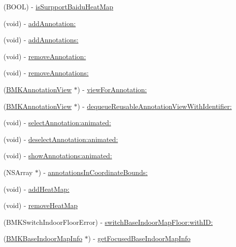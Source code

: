 \begin{DoxyCompactItemize}
\item 
(B\+O\+O\+L) -\/ \hyperlink{interface_b_m_k_map_view_a2256a65857b14f9cd56655663a966e14}{is\+Surpport\+Baidu\+Heat\+Map}
\item 
(void) -\/ \hyperlink{interface_b_m_k_map_view_a2af9ed45c3a7fd530dd414dc573327b3}{add\+Annotation\+:}
\item 
(void) -\/ \hyperlink{interface_b_m_k_map_view_affd032313c55ae27814430b760e4aea0}{add\+Annotations\+:}
\item 
(void) -\/ \hyperlink{interface_b_m_k_map_view_a6b6b75a5bf8b02854767f782a38d2009}{remove\+Annotation\+:}
\item 
(void) -\/ \hyperlink{interface_b_m_k_map_view_a37fbe2b5db750affb4e0234cbf24a3c7}{remove\+Annotations\+:}
\item 
(\hyperlink{interface_b_m_k_annotation_view}{B\+M\+K\+Annotation\+View} $\ast$) -\/ \hyperlink{interface_b_m_k_map_view_a0fb885234188aef28df944d5f636c70c}{view\+For\+Annotation\+:}
\item 
(\hyperlink{interface_b_m_k_annotation_view}{B\+M\+K\+Annotation\+View} $\ast$) -\/ \hyperlink{interface_b_m_k_map_view_a4d4aa7a171876f3f66add8f86cca1e8c}{dequeue\+Reusable\+Annotation\+View\+With\+Identifier\+:}
\item 
(void) -\/ \hyperlink{interface_b_m_k_map_view_a92dbf00c3eff2ede4d4ffd485c4059e0}{select\+Annotation\+:animated\+:}
\item 
(void) -\/ \hyperlink{interface_b_m_k_map_view_a3d6bbc91bc3b66463ee97b3c909e4999}{deselect\+Annotation\+:animated\+:}
\item 
(void) -\/ \hyperlink{interface_b_m_k_map_view_a62093e51bd52b357d909b75b4447b415}{show\+Annotations\+:animated\+:}
\item 
(N\+S\+Array $\ast$) -\/ \hyperlink{interface_b_m_k_map_view_ac683d0d593744c75684063fe8dc9fdcd}{annotations\+In\+Coordinate\+Bounds\+:}
\item 
(void) -\/ \hyperlink{interface_b_m_k_map_view_a5945dec15b2d38ecf4b8efd4ce6b49e2}{add\+Heat\+Map\+:}
\item 
(void) -\/ \hyperlink{interface_b_m_k_map_view_a1337cb03abdb9ae730a2410f0fbd2f2f}{remove\+Heat\+Map}
\item 
(B\+M\+K\+Switch\+Indoor\+Floor\+Error) -\/ \hyperlink{interface_b_m_k_map_view_a4fa740d5b128accf89a08af73885f5fd}{switch\+Base\+Indoor\+Map\+Floor\+:with\+I\+D\+:}
\item 
(\hyperlink{interface_b_m_k_base_indoor_map_info}{B\+M\+K\+Base\+Indoor\+Map\+Info} $\ast$) -\/ \hyperlink{interface_b_m_k_map_view_a0790ec2a447b1525ecb467fc8dce0e26}{get\+Focused\+Base\+Indoor\+Map\+Info}

\end{DoxyCompactItemize}
